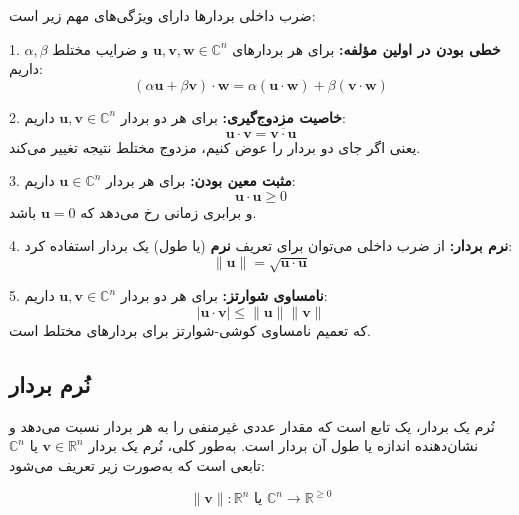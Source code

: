 \begin{nokteh}

ضرب داخلی بردارها دارای ویژگی‌های مهم زیر است:

1. \textbf{خطی بودن در اولین مؤلفه:}  
برای هر بردارهای $\mathbf{u}, \mathbf{v}, \mathbf{w} \in \mathbb{C}^n$ و ضرایب مختلط $\alpha, \beta$ داریم:
\[
(\alpha \mathbf{u} + \beta \mathbf{v}) \cdot \mathbf{w} = \alpha (\mathbf{u} \cdot \mathbf{w}) + \beta (\mathbf{v} \cdot \mathbf{w})
\]

2. \textbf{خاصیت مزدوج‌گیری:}  
برای هر دو بردار $\mathbf{u}, \mathbf{v} \in \mathbb{C}^n$ داریم:
\[
\mathbf{u} \cdot \mathbf{v} = \overline{\mathbf{v} \cdot \mathbf{u}}
\]
یعنی اگر جای دو بردار را عوض کنیم، مزدوج مختلط نتیجه تغییر می‌کند.

3. \textbf{مثبت معین بودن:}  
برای هر بردار $\mathbf{u} \in \mathbb{C}^n$ داریم:
\[
\mathbf{u} \cdot \mathbf{u} \geq 0
\]
و برابری زمانی رخ می‌دهد که $\mathbf{u} = 0$ باشد.

4. \textbf{نرم بردار:}  
از ضرب داخلی می‌توان برای تعریف \textbf{نرم} (یا طول) یک بردار استفاده کرد:
\[
\|\mathbf{u}\| = \sqrt{\mathbf{u} \cdot \mathbf{u}}
\]

5. \textbf{نامساوی شوارتز:}  
برای هر دو بردار $\mathbf{u}, \mathbf{v} \in \mathbb{C}^n$ داریم:
\[
|\mathbf{u} \cdot \mathbf{v}| \leq \|\mathbf{u}\| \|\mathbf{v}\|
\]
که تعمیم نامساوی کوشی-شوارتز برای بردارهای مختلط است.


\end{nokteh}
\subsection{نُرم بردار}
نُرم یک بردار، یک تابع است که مقدار عددی غیرمنفی را به هر بردار نسبت می‌دهد و نشان‌دهنده اندازه یا طول آن بردار است. به‌طور کلی، نُرم یک بردار $\mathbf{v} \in \mathbb{R}^n$ یا $\mathbb{C}^n$ تابعی است که به‌صورت زیر تعریف می‌شود:

\[
\|\mathbf{v}\|: \mathbb{R}^n \text{ یا } \mathbb{C}^n \to \mathbb{R}^{\geq 0}
\]

